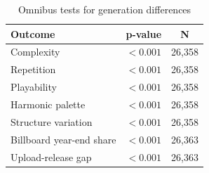 \begin{table}[H]
\centering
\caption{Omnibus tests for generation differences}
\label{tab:generation_tests}
\begin{tabular}{lcc}
\toprule
Outcome & p-value & N \\
\midrule
Complexity & $<0.001$ & 26,358 \\
Repetition & $<0.001$ & 26,358 \\
Playability & $<0.001$ & 26,358 \\
Harmonic palette & $<0.001$ & 26,358 \\
Structure variation & $<0.001$ & 26,358 \\
Billboard year-end share & $<0.001$ & 26,363 \\
Upload-release gap & $<0.001$ & 26,363 \\
\bottomrule
\end{tabular}
\end{table}
